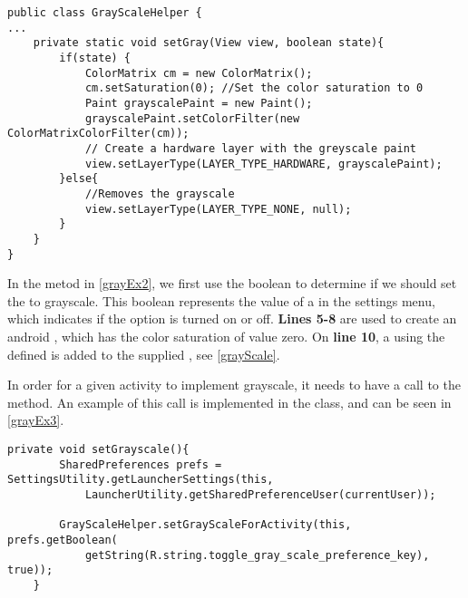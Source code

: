 \begin{minipage}[H]{\linewidth}
\begin{lstlisting}[caption = Method used to change to color saturation of views., label = grayEx2]
public class GrayScaleHelper {
...
    private static void setGray(View view, boolean state){
        if(state) {
            ColorMatrix cm = new ColorMatrix();
            cm.setSaturation(0); //Set the color saturation to 0
            Paint grayscalePaint = new Paint();
            grayscalePaint.setColorFilter(new ColorMatrixColorFilter(cm));
            // Create a hardware layer with the greyscale paint
            view.setLayerType(LAYER_TYPE_HARDWARE, grayscalePaint);
        }else{
            //Removes the grayscale
            view.setLayerType(LAYER_TYPE_NONE, null);
        }
    }
}
\end{lstlisting}
\end{minipage}

In the  metod in \autoref{grayEx2}, we first use the boolean
 to determine if we should set the  to grayscale. This
boolean represents the value of a  in the settings menu,
which indicates if the option is turned on or off. \textbf{Lines 5-8} are used
to create an android , which has the color saturation of value
zero. On \textbf{line 10}, a  using the defined
 is added to the supplied , see
\autoref{grayScale}.\nl


In order for a given activity to implement grayscale, it needs to have a call to
the  method. An example of this call is
implemented in the  class, and can be seen in
\autoref{grayEx3}.\nl

\begin{minipage}[H]{\linewidth}
\begin{lstlisting}[caption = Setting grayscale by calling the setGrayScaleForActivity method, label = grayEx3] 
private void setGrayscale(){
        SharedPreferences prefs = SettingsUtility.getLauncherSettings(this,
            LauncherUtility.getSharedPreferenceUser(currentUser));

        GrayScaleHelper.setGrayScaleForActivity(this, prefs.getBoolean(
            getString(R.string.toggle_gray_scale_preference_key), true));
    }
\end{lstlisting}
\end{minipage}

